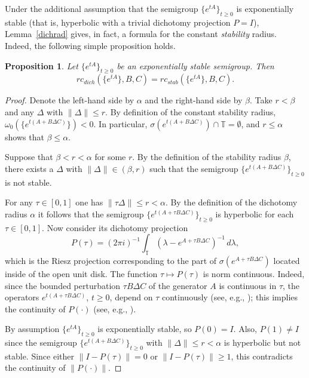 \documentclass[10pt,psamsfonts,leqno]{siamltex}
\newtheorem{prop}{Proposition}[section]
\newcommand{\bbT}{\mathbb{T}}
\begin{document}
Under the additional assumption that the semigroup
$\{e^{tA}\}_{t\ge 0}$ is exponentially stable
(that is, hyperbolic with a trivial dichotomy projection $P=I$),
Lemma~\ref{dichrad} gives, in fact, a formula for the constant {\it
stability} radius. Indeed, the following simple proposition holds.

\begin{prop}\label{dichst}
Let $\{e^{tA}\}_{t\ge0}$ be an exponentially stable semigroup.
Then
\[
rc_{dich}(\{e^{tA}\},B,C)= rc_{stab}(\{e^{tA}\},B,C).
\]
\end{prop}

\begin{proof} Denote the left-hand side by $\alpha$
and the right-hand side by $\beta$. Take $r<\beta$ and any $\Delta$
with $\|\Delta\|\le r$. By definition of the constant stability
radius, $\omega_0(\{e^{t(A+B\Delta C)}\})<0$. In particular,
$\sigma(e^{t(A+B\Delta C)})\cap\bbT=\emptyset$, and $r\le \alpha$ shows
that $\beta\le\alpha$.

Suppose that $\beta<r<\alpha$ for some $r$. By the definition of the
stability radius $\beta$,
there exists a $\Delta$ with $\|\Delta\|\in(\beta,r)$
such that
the semigroup $\{e^{t(A+B\Delta C)}\}_{t\ge0}$ is not stable.

For any $\tau\in[0,1]$
one has $\|\tau\Delta\|\le r<\alpha$. By the definition of the
dichotomy radius $\alpha$ it follows that the semigroup
$\{e^{t(A+\tau B\Delta C)}\}_{t\ge 0}$ is hyperbolic
for each $\tau\in[0,1]$.
Now consider its dichotomy projection
\[P(\tau)=(2\pi i)^{-1}\int_{\bbT}
\left(\lambda-e^{A+\tau B\Delta C}\right)^{-1}\,d\lambda,\]
which is the Riesz projection corresponding to the part
of $\sigma(e^{A+\tau B\Delta C})$ located inside of the open unit disk.
The function $\tau\mapsto P(\tau)$ is norm continuous.
Indeed, since the bounded perturbation $\tau B\Delta C$ of the
generator $A$ is continuous in $\tau$, the operators
$e^{t(A+\tau B\Delta C)}$, ${t\ge 0}$, depend on $\tau$
 continuously
(see, e.g., \cite[Corollary~3.1.3]{Pazy}); this implies
 the continuity of $P(\cdot)$ (see, e.g.,
\cite[Theorem~I.2.2]{DK}).

By assumption $\{e^{tA}\}_{t\ge 0}$ is exponentially stable, so
$P(0)=I$.
Also, $P(1)\neq I$ since the semigroup
$\{e^{t(A+B\Delta C)}\}_{t\ge 0}$ with
$\|\Delta\|\le r<\alpha$ is hyperbolic but not stable.
Since either  $\|I-P(\tau)\|=0$ or $\|I-P(\tau)\|\ge 1$, this
contradicts
the continuity of $\|P(\cdot)\|$.
\end{proof}
\end{document}
